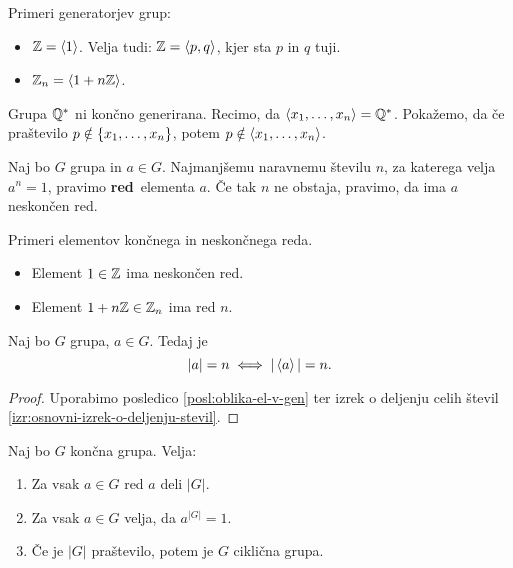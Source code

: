 \newpage
\begin{zgled}
    Primeri generatorjev grup:
    \begin{itemize}
        \item $\mathbb{Z} = \left\langle {1} \right\rangle$. Velja tudi: $\mathbb{Z} = \left\langle {p, q} \right\rangle$, kjer sta $p$ in $q$ tuji.
        \item $\mathbb{Z}_n = \left\langle {1 + n\mathbb{Z}} \right\rangle$.
    \end{itemize}
\end{zgled}

\begin{zgled}
    Grupa \(\mathbb{Q}^*\) ni končno generirana. Recimo, da \(\left\langle {x_1, \ldots, x_n} \right\rangle = \mathbb{Q}^*\). Pokažemo, da če praštevilo \(p \notin \left\{x_1, \ldots, x_n\right\}\), potem \(p \notin \left\langle {x_1, \ldots, x_n} \right\rangle\).
\end{zgled}

\begin{definicija}
    Naj bo $G$ grupa in $a \in G$. Najmanjšemu naravnemu številu $n$, za katerega velja $a^n=1$, pravimo \textbf{red}~elementa $a$. Če tak $n$ ne obstaja, pravimo, da ima $a$ neskončen red.
\end{definicija}

\begin{primer}
    Primeri elementov končnega in neskončnega reda.
    \begin{itemize}
        \item Element $1 \in \mathbb{Z}$ ima neskončen red.
        \item Element $1 + n\mathbb{Z} \in \mathbb{Z}_n$ ima red $n$.
    \end{itemize}    
\end{primer}

\begin{trditev}
    Naj bo $G$ grupa, $a \in G$. Tedaj je 
    \[|a| = n \iff |\left\langle {a} \right\rangle| = n.\]
\end{trditev}

\begin{proof}
    Uporabimo posledico \ref{posl:oblika-el-v-gen} ter izrek o deljenju celih števil \ref{izr:osnovni-izrek-o-deljenju-stevil}.
\end{proof}

\begin{posledica}
    Naj bo $G$ končna grupa. Velja:
    \begin{enumerate}
        \item Za vsak $a \in G$ red $a$ deli $|G|$.
        \item Za vsak $a \in G$ velja, da $a^{|G|} = 1$.
        \item Če je $|G|$ praštevilo, potem je $G$ ciklična grupa. 
    \end{enumerate}
\end{posledica}